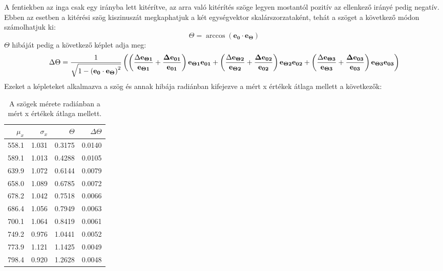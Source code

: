 \documentclass[10pt,pdftex]{report}
\begin{document}
A fentiekben az inga csak egy irányba lett kitérítve, az arra való kitérítés szöge legyen mostantól pozitív az ellenkező irányé pedig negatív. Ebben az esetben a kitérési szög 
kiszinuszát megkaphatjuk a két egységvektor skalárszorzataként, tehát a szöget a következő módon számolhatjuk ki:
\begin{equation*}
    \Theta = \arccos\left(\mathbf{e_0}\cdot\mathbf{e_{\Theta}}\right)
\end{equation*}
$\Theta$ hibáját pedig a következő képlet adja meg:
\begin{equation*}
    \centering
    \Delta\Theta = \frac{1}{\sqrt{1 - \left(\mathbf{e_0}\cdot\mathbf{e_{\Theta}}\right)^2}}\left(\left(\frac{\Delta\mathbf{e_{\Theta1}}}{\mathbf{e_{\Theta1}}}+\frac{\mathbf{\Delta e_{01}}}{\mathbf{e_{01}}}\right)\mathbf{e_{\Theta1}}\mathbf{e_{01}}
    +\left(\frac{\Delta\mathbf{e_{\Theta2}}}{\mathbf{e_{\Theta2}}}+\frac{\mathbf{\Delta e_{02}}}{\mathbf{e_{02}}}\right)\mathbf{e_{\Theta2}}\mathbf{e_{02}}+\left(\frac{\Delta\mathbf{e_{\Theta3}}}{\mathbf{e_{\Theta3}}}+\frac{\mathbf{\Delta e_{03}}}{\mathbf{e_{03}}}\right)\mathbf{e_{\Theta3}}\mathbf{e_{03}}\right)
\end{equation*}
Ezeket a képleteket alkalmazva a szög és annak hibája radiánban kifejezve a mért x értékek átlaga mellett a következők:
\begin{table}[H]
    \centering
    \begin{tabular}{|r|r|r|r|}
        \hline
        $\mu_x$ & $\sigma_x$ & $\Theta$ & $\Delta\Theta$ \\
        \hline
        558.1 & 1.031 & 0.3175 & 0.0140 \\
        \hline
        589.1 & 1.013 & 0.4288 & 0.0105 \\
        \hline
        639.9 & 1.072 & 0.6144 & 0.0079 \\
        \hline
        658.0 & 1.089 & 0.6785 & 0.0072 \\
        \hline
        678.2 & 1.042 & 0.7518 & 0.0066 \\
        \hline
        686.4 & 1.056 & 0.7949 & 0.0063 \\
        \hline
        700.1 & 1.064 & 0.8419 & 0.0061 \\
        \hline
        749.2 & 0.976 & 1.0441 & 0.0052 \\
        \hline
        773.9 & 1.121 & 1.1425 & 0.0049 \\
        \hline
        798.4 & 0.920 & 1.2628 & 0.0048 \\
        \hline
    \end{tabular}
    \caption{A szögek mérete radiánban a mért x értékek átlaga mellett.}
\end{table}
\end{document}
